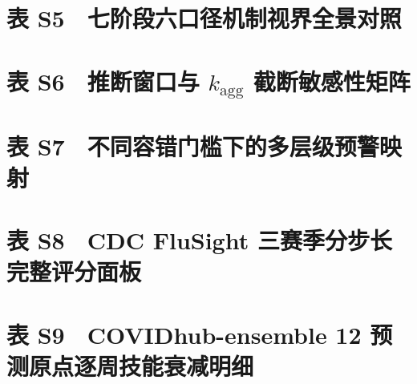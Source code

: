\documentclass[11pt,a4paper]{article}
\newcommand{\suppdir}{../tables_v3}
\begin{document}
\clearpage
\section*{表 S5　七阶段六口径机制视界全景对照}
\begin{table}[htbp]\centering\scriptsize
\caption{各阶段在六类机制视界口径下的州级中位视界（周），并与同定义实测绝对误差视界及相对持续性基线的业务时效对照。$h^*_{\text{macro}}$ 为正文主口径（固定 $k_{\text{agg}}$ 的 NB2 更新模型、周度时钟）；$h^*_{k}$ 三列为代入三档个体级离散度（实测 $\hat k$）的启发式尺度映射，仅作平行敏感性对照}

\end{table}

\section*{表 S6　推断窗口与 $k_{\text{agg}}$ 截断敏感性矩阵}
\begin{table}[htbp]\centering\footnotesize
\caption{各阶段州级中位机制视界对推断窗口长度（5/6/8/10 周）与 $k_{\text{agg}}$ 上限截断（100/500/1{,}000/无约束）的敏感性}

\end{table}

\section*{表 S7　不同容错门槛下的多层级预警映射}
\begin{table}[htbp]\centering\footnotesize
\caption{各阶段州级机制视界在四种容忍度门槛 $\tau$ 下的取值（括号内为参与辖区数）}

\end{table}

\clearpage
\section*{表 S8　CDC FluSight 三赛季分步长完整评分面板}
\begin{table}[htbp]\centering\scriptsize
\caption{三个锁定赛季在 $h=1,2,3$ 周提前期下的三模型完整评分面板。每行三个模型在同一（赛季, 提前期）单元内共享完全相同的 $n$（严格四方交集），故差值可直接读作配对性能差。逐单元、逐辖区的明细见随包 \texttt{reports\_v3/flusight\_v1.*.csv}}

\end{table}

\section*{表 S9　COVIDhub-ensemble 12 预测原点逐周技能衰减明细}
\begin{table}[htbp]\centering\scriptsize
\caption{Delta 与 Omicron 两波共 12 个预测原点、$h=1$--$4$ 周的跨州中位平方误差比率（相对持续性基线）与绝对加权区间评分明细}

\end{table}
\end{document}
